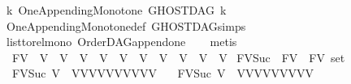 \begin{isabellebody}
\ {\isachardoublequoteopen}{\isasymforall}k{\isachardot}{\kern0pt}\ One{\isacharunderscore}{\kern0pt}Appending{\isacharunderscore}{\kern0pt}Monotone\ {\isacharparenleft}{\kern0pt}GHOSTDAG\ k{\isacharparenright}{\kern0pt}{\isachardoublequoteclose}\isanewline
%
\isadelimproof
\ \ %
\endisadelimproof
%
\isatagproof
{}\isamarkupfalse%
\ One{\isacharunderscore}{\kern0pt}Appending{\isacharunderscore}{\kern0pt}Monotone{\isacharunderscore}{\kern0pt}def\ GHOSTDAG{\isachardot}{\kern0pt}simps\ \isanewline
\ \ \isamarkupfalse%
\ list{\isacharunderscore}{\kern0pt}to{\isacharunderscore}{\kern0pt}rel{\isacharunderscore}{\kern0pt}mono\ OrderDAG{\isacharunderscore}{\kern0pt}append{\isacharunderscore}{\kern0pt}one\isanewline
\ \ \isamarkupfalse%
\ metis%
\endisatagproof
{\isafoldproof}%
%
\isadelimproof
%
\endisadelimproof
%
\isadelimdocument
%
\endisadelimdocument
%
\isatagdocument
%
\isamarkuptrue%
%
\endisatagdocument
{\isafolddocument}%
%
\isadelimdocument
%
\endisadelimdocument
{}\isamarkupfalse%
\ \ FV\ {\isacharequal}{\kern0pt}\ V{}\ {\isacharbar}{\kern0pt}\ V{}\ {\isacharbar}{\kern0pt}\ V{}\ {\isacharbar}{\kern0pt}\ V{}\ {\isacharbar}{\kern0pt}\ V{}\ {\isacharbar}{\kern0pt}\ V{}\ {\isacharbar}{\kern0pt}\ V{}\ {\isacharbar}{\kern0pt}\ V{}\ {\isacharbar}{\kern0pt}\ V{}\ {\isacharbar}{\kern0pt}\ V{}{}\isanewline
\isanewline
{}\isamarkupfalse%
\ FV{\isacharunderscore}{\kern0pt}Suc\ {\isacharcolon}{\kern0pt}{\isacharcolon}{\kern0pt}{\isachardoublequoteopen}\ FV\ {\isasymRightarrow}\ FV\ set{\isachardoublequoteclose}\ \isanewline
\ \ \ \isanewline
\ \ {\isachardoublequoteopen}FV{\isacharunderscore}{\kern0pt}Suc\ V{}\ {\isacharequal}{\kern0pt}\ {\isacharbraceleft}{\kern0pt}V{}{\isacharcomma}{\kern0pt}V{}{\isacharcomma}{\kern0pt}V{}{\isacharcomma}{\kern0pt}V{}{\isacharcomma}{\kern0pt}V{}{\isacharcomma}{\kern0pt}V{}{\isacharcomma}{\kern0pt}V{}{\isacharcomma}{\kern0pt}V{}{\isacharcomma}{\kern0pt}V{}{\isacharcomma}{\kern0pt}V{}{}{\isacharbraceright}{\kern0pt}{\isachardoublequoteclose}\ {\isacharbar}{\kern0pt}\isanewline
\ \ {\isachardoublequoteopen}FV{\isacharunderscore}{\kern0pt}Suc\ V{}\ {\isacharequal}{\kern0pt}\ {\isacharbraceleft}{\kern0pt}V{}{\isacharcomma}{\kern0pt}V{}{\isacharcomma}{\kern0pt}V{}{\isacharcomma}{\kern0pt}V{}{\isacharcomma}{\kern0pt}V{}{\isacharcomma}{\kern0pt}V{}{\isacharcomma}{\kern0pt}V{}{\isacharcomma}{\kern0pt}V{}{\isacharcomma}{\kern0pt}V{}{}{\isacharbraceright}{\kern0pt}{\isachardoublequoteclose}\ {\isacharbar}{\kern0pt}\isanewline

\end{isabellebody}
